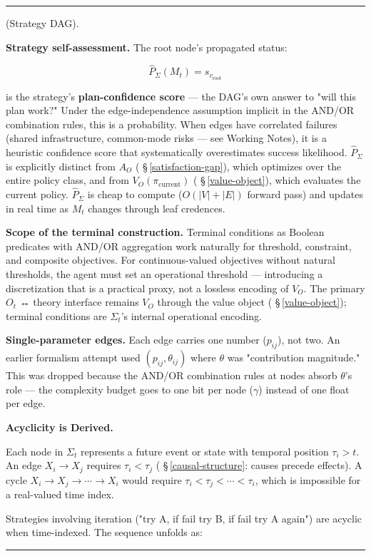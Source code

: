 \documentclass[11pt,oneside]{article}
\newcounter{claim}[section]
\renewcommand{\theclaim}{\thesection.\arabic{claim}}
\newenvironment{segment}[2]{%
  \refstepcounter{claim}%
  \bigskip\noindent\hrule\smallskip
  \noindent{\bfseries #1~\theclaim}\enskip(#2).\par\smallskip
  \noindent\ignorespaces
}{%
  \par\smallskip\noindent\hrule\bigskip
}
\newenvironment{definition}[1][]{\begin{segment}{Definition}{#1}}{\end{segment}}
\begin{document}
\begin{definition}[Strategy DAG]
\textbf{Strategy self-assessment.} The root node's propagated status:

$$\hat{P}_\Sigma(M_t) = s_{v_\text{root}}$$

is the strategy's \textbf{plan-confidence score} — the DAG's own answer to "will this plan work?" Under the edge-independence assumption implicit in the AND/OR combination rules, this is a probability. When edges have correlated failures (shared infrastructure, common-mode risks — see Working Notes), it is a heuristic confidence score that systematically overestimates success likelihood. $\hat P_\Sigma$ is explicitly distinct from $A_O$ ( \S\,\ref{satisfaction-gap}), which optimizes over the entire policy class, and from $V_O(\pi_\text{current})$ ( \S\,\ref{value-object}), which evaluates the current policy. $\hat P_\Sigma$ is cheap to compute ($O(\lvert V\rvert + \lvert E\rvert)$ forward pass) and updates in real time as $M_t$ changes through leaf credences.

\textbf{Scope of the terminal construction.} Terminal conditions as Boolean predicates with AND/OR aggregation work naturally for threshold, constraint, and composite objectives. For continuous-valued objectives without natural thresholds, the agent must set an operational threshold — introducing a discretization that is a practical proxy, not a lossless encoding of $V_O$. The primary $O_t$ ↔ theory interface remains $V_O$ through the value object ( \S\,\ref{value-object}); terminal conditions are $\Sigma_t$'s internal operational encoding.

\textbf{Single-parameter edges.} Each edge carries one number ($p_{ij}$), not two. An earlier formalism attempt used $(p_{ij}, \theta_{ij})$ where $\theta$ was "contribution magnitude." This was dropped because the AND/OR combination rules at nodes absorb $\theta$'s role — the complexity budget goes to one bit per node ($\gamma$) instead of one float per edge.


\medskip\noindent\textbf{Acyclicity is Derived.}



Each node in $\Sigma_t$ represents a future event or state with temporal position $\tau_i > t$. An edge $X_i \to X_j$ requires $\tau_i < \tau_j$ ( \S\,\ref{causal-structure}: causes precede effects). A cycle $X_i \to X_j \to \cdots \to X_i$ would require $\tau_i < \tau_j < \cdots < \tau_i$, which is impossible for a real-valued time index.

Strategies involving iteration ("try A, if fail try B, if fail try A again") are acyclic when time-indexed. The sequence unfolds as:


\end{definition}
\end{document}
